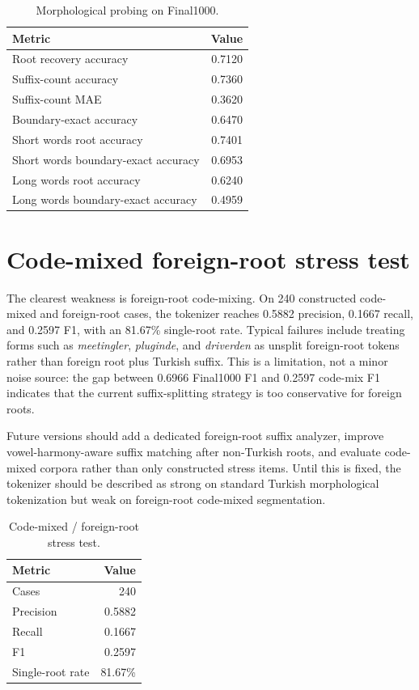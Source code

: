 \documentclass[11pt]{article}
\begin{document}
\begin{table}[h]
\centering
\caption{Morphological probing on Final1000.}
\label{tab:probe}
\begin{tabular}{lr}
\toprule
Metric & Value \\
\midrule
Root recovery accuracy & 0.7120 \\
Suffix-count accuracy & 0.7360 \\
Suffix-count MAE & 0.3620 \\
Boundary-exact accuracy & 0.6470 \\
Short words root accuracy & 0.7401 \\
Short words boundary-exact accuracy & 0.6953 \\
Long words root accuracy & 0.6240 \\
Long words boundary-exact accuracy & 0.4959 \\
\bottomrule
\end{tabular}
\end{table}

\section{Code-mixed foreign-root stress test}
The clearest weakness is foreign-root code-mixing. On 240 constructed code-mixed and foreign-root cases, the tokenizer reaches 0.5882 precision, 0.1667 recall, and 0.2597 F1, with an 81.67\% single-root rate. Typical failures include treating forms such as \textit{meetingler}, \textit{pluginde}, and \textit{driverden} as unsplit foreign-root tokens rather than foreign root plus Turkish suffix. This is a limitation, not a minor noise source: the gap between 0.6966 Final1000 F1 and 0.2597 code-mix F1 indicates that the current suffix-splitting strategy is too conservative for foreign roots.

Future versions should add a dedicated foreign-root suffix analyzer, improve vowel-harmony-aware suffix matching after non-Turkish roots, and evaluate code-mixed corpora rather than only constructed stress items. Until this is fixed, the tokenizer should be described as strong on standard Turkish morphological tokenization but weak on foreign-root code-mixed segmentation.

\begin{table}[h]
\centering
\caption{Code-mixed / foreign-root stress test.}
\label{tab:codemix}
\begin{tabular}{lr}
\toprule
Metric & Value \\
\midrule
Cases & 240 \\
Precision & 0.5882 \\
Recall & 0.1667 \\
F1 & 0.2597 \\
Single-root rate & 81.67\% \\
\bottomrule
\end{tabular}
\end{table}
\end{document}
